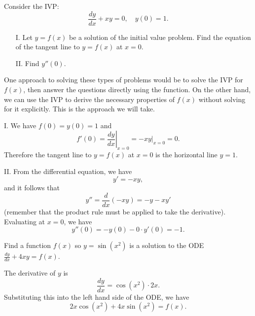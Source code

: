\documentclass[noauthor, handout]{ximera}
\begin{document}
\begin{problem} 
Consider the IVP: $$\frac{dy}{dx} +xy =0, \quad y(0)=1.$$  

\begin{itemize}
\item[I.]  Let $y=f(x)$ be a solution of the initial value problem.  Find the equation of the tangent line to $y=f(x)$ at $x=0$.
\item[II.] Find  $y''(0)$.
\end{itemize}

\begin{freeResponse}
One approach to solving these types of problems would be to solve the IVP for $f(x)$, then answer the questions directly using the function. On the other hand, we can use the IVP to derive the necessary properties of $f(x)$ without solving for it explicitly. This is the approach we will take.

I. We have $f(0) = y(0) = 1$ and 
$$
f'(0) = \left.\frac{dy}{dx}\right|_{x=0} = \left.-xy\right|_{x=0} = 0.
$$
Therefore the tangent line to $y=f(x)$ at $x=0$ is the horizontal line $y=1$. 

II. From the differential equation, we have
$$
y' = -xy,
$$
and it follows that
$$
y'' = \frac{d}{dx}(-xy) = -y - xy'
$$
(remember that the product rule must be applied to take the derivative). Evaluating at $x=0$, we have
$$
y''(0) = -y(0)-0 \cdot y'(0) = -1.
$$
\end{freeResponse}
\end{problem}


\begin{problem} 
Find a function $f(x)$ so $y=\sin(x^2)$ is a solution to the ODE $\frac{dy}{dx}+4xy = f(x)$.

\begin{freeResponse}
The derivative of $y$ is 
$$
\frac{dy}{dx} = \cos(x^2)\cdot 2x.
$$
Substituting this into the left hand side of the ODE, we have
$$
2x \cos(x^2)  + 4x \sin(x^2) = f(x).
$$
\end{freeResponse}
\end{problem}
\end{document}
